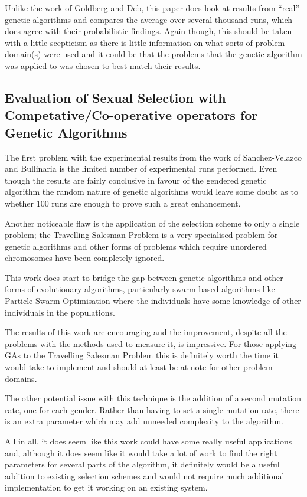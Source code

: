 \documentclass[10pt, a4paper]{article}
\begin{document}
Unlike the work of Goldberg and Deb, this paper does look at results from
``real'' genetic algorithms and compares the average over several thousand 
runs, which does agree with their probabilistic findings. Again though, this
should be taken with a little scepticism as there is little information on what
sorts of problem domain(s) were used and it could be that the problems that the
genetic algorithm was applied to was chosen to best match their results.


\subsection{Evaluation of Sexual Selection with Competative/Co-operative operators for Genetic Algorithms}
The first problem with the experimental results from the work of 
Sanchez-Velazco and Bullinaria\cite{SanchezVelazco2003Sexual} is the limited
number of experimental runs performed. Even though the results are fairly
conclusive in favour of the gendered genetic algorithm the random nature of
genetic algorithms would leave some doubt as to whether 100 runs are enough to
prove such a great enhancement.

Another noticeable flaw is the application of the selection scheme to only a
single problem; the Travelling Salesman Problem is a very specialised problem
for genetic algorithms and other forms of problems which require unordered
chromosomes have been completely ignored.

This work does start to bridge the gap between genetic algorithms and other
forms of evolutionary algorithms, particularly swarm-based algorithms like
Particle Swarm Optimisation where the individuals have some knowledge of other
individuals in the populations.

The results of this work are encouraging and the improvement, despite all the
problems with the methods used to measure it, is impressive. For those applying
GAs to the Travelling Salesman Problem this is definitely worth the time it
would take to implement and should at least be at note for other problem
domains.

The other potential issue with this technique is the addition of a second
mutation rate, one for each gender. Rather than having to set a single mutation
rate, there is an extra parameter which may add unneeded complexity to the
algorithm.

All in all, it does seem like this work could have some really useful
applications and, although it does seem like it would take a lot of work to find
the right parameters for several parts of the algorithm, it definitely would be
a useful addition to existing selection schemes and would not require much
additional implementation to get it working on an existing system.

\newpage


\end{document}
